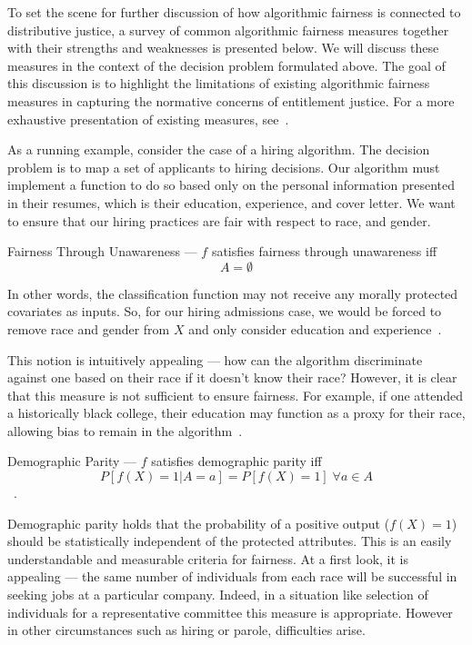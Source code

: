 To set the scene for further discussion of how algorithmic fairness is 
connected to distributive justice, a survey of common algorithmic fairness 
measures together with their strengths and weaknesses is presented below.
We will discuss these measures in the context of the decision problem formulated
above. The goal of this discussion is to highlight the limitations of
existing algorithmic fairness measures in capturing the normative concerns of 
entitlement justice. For a more exhaustive presentation of existing measures,
see~\cite{CorbettDavies_2023}.

As a running example, consider the case of a hiring algorithm. The decision
problem is to map a set of applicants to hiring decisions. Our algorithm must
implement a function to do so based only on the personal information presented
in their resumes, which is their education, experience, and cover letter. We
want to ensure that our hiring practices are fair with respect to race, and
gender. 

\begin{definition}
    Fairness Through Unawareness — $f$ satisfies fairness through unawareness iff
    \[A = \emptyset\]
\end{definition}

In other words, the classification function may not receive any morally
protected covariates as inputs. So, for our hiring admissions case, we would be
forced to remove race and gender from $X$ and only consider education and
experience~\citep{CorbettDavies_2023}.

This notion is intuitively appealing — how can the algorithm discriminate
against one based on their race if it doesn't know their race? However, it is
clear that this measure is not sufficient to ensure fairness. For example, if
one attended a historically black college, their education may function as a
proxy for their race, allowing bias to remain in the
algorithm~\citep{Datta_2017}.

\begin{definition}
    Demographic Parity — $f$ satisfies demographic parity iff
    \[P[f(X) = 1 | A = a] = P[f(X) = 1]\;\forall a \in A\]~\citep{Dwork_2012}.
\end{definition}

Demographic parity holds that the probability of a positive output ($f(X) = 1$)
should be statistically independent of the protected attributes. This is 
an easily understandable and measurable criteria for fairness. At a first look,
it is appealing — the same number of individuals from each race will be
successful in seeking jobs at a particular company. Indeed, in a situation like
selection of individuals for a representative committee this measure is
appropriate. However in other circumstances such as hiring or parole,
difficulties arise.

